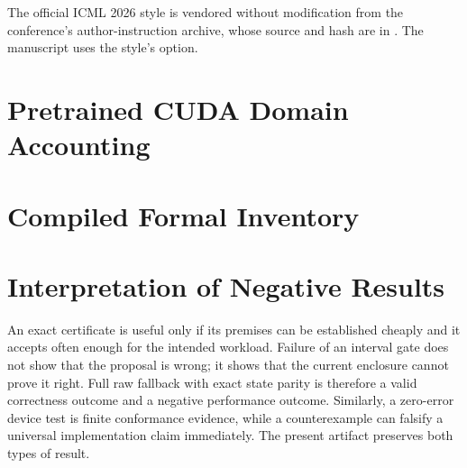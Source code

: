The official ICML 2026 style is vendored without modification from the
conference's author-instruction archive, whose source and hash are in
. The manuscript uses the style's
 option.

\section{Pretrained CUDA Domain Accounting}
\label{app:domains}


\section{Compiled Formal Inventory}
\label{app:formal}


\section{Interpretation of Negative Results}

An exact certificate is useful only if its premises can be established
cheaply and it accepts often enough for the intended workload. Failure of
an interval gate does not show that the proposal is wrong; it shows that
the current enclosure cannot prove it right. Full raw fallback with exact
state parity is therefore a valid correctness outcome and a negative
performance outcome. Similarly, a zero-error device test is finite
conformance evidence, while a counterexample can falsify a universal
implementation claim immediately. The present artifact preserves both
types of result.
